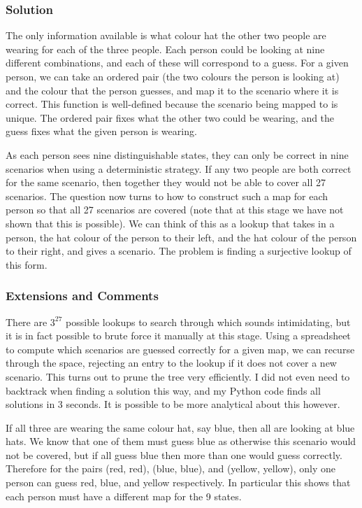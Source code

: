 \subsubsection{Solution}

The only information available is what colour hat the other two people are wearing for each of the three people. Each person could be looking at nine different combinations, and each of these will correspond to a guess. For a given person, we can take an ordered pair (the two colours the person is looking at) and the colour that the person guesses, and map it to the scenario where it is correct. This function is well-defined because the scenario being mapped to is unique. The ordered pair fixes what the other two could be wearing, and the guess fixes what the given person is wearing.

As each person sees nine distinguishable states, they can only be correct in nine scenarios when using a deterministic strategy. If any two people are both correct for the same scenario, then together they would not be able to cover all 27 scenarios. The question now turns to how to construct such a map for each person so that all 27 scenarios are covered (note that at this stage we have not shown that this is possible). We can think of this as a lookup that takes in a person, the hat colour of the person to their left, and the hat colour of the person to their right, and gives a scenario. The problem is finding a surjective lookup of this form.



\subsubsection{Extensions and Comments}

There are $3^{27}$ possible lookups to search through which sounds intimidating, but it is in fact possible to brute force it manually at this stage. Using a spreadsheet to compute which scenarios are guessed correctly for a given map, we can recurse through the space, rejecting an entry to the lookup if it does not cover a new scenario. This turns out to prune the tree very efficiently. I did not even need to backtrack when finding a solution this way, and my Python code finds all solutions in 3 seconds. It is possible to be more analytical about this however.

If all three are wearing the same colour hat, say blue, then all are looking at blue hats. We know that one of them must guess blue as otherwise this scenario would not be covered, but if all guess blue then more than one would guess correctly. Therefore for the pairs (red, red), (blue, blue), and (yellow, yellow), only one person can guess red, blue, and yellow respectively. In particular this shows that each person must have a different map for the 9 states.

